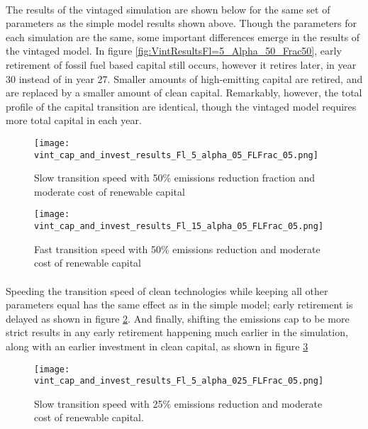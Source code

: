 \documentclass{article}
\begin{document}
\paragraph{} The results of the vintaged simulation are shown below for the same set of parameters as the simple model results shown above. Though the parameters for each simulation are the same, some important differences emerge in the results of the vintaged model. In figure \ref{fig:VintResultsFl=5_Alpha_50_Frac50}, early retirement of fossil fuel based capital still occurs, however it retires later, in year 30 instead of in year 27. Smaller amounts of high-emitting capital are retired, and are replaced by a smaller amount of clean capital. Remarkably, however, the total profile of the capital transition are identical, though the vintaged model requires more total capital in each year. 

\begin{figure}[h]
\texttt{[image: vint\_cap\_and\_invest\_results\_Fl\_5\_alpha\_05\_FLFrac\_05.png]}
\caption{Slow transition speed with 50\% emissions reduction fraction and moderate cost of renewable capital\label{fig:VintResultsFl=5_Alpha50_Frac50}}
\end{figure}

\FloatBarrier


\begin{figure}[H]
\texttt{[image: vint\_cap\_and\_invest\_results\_Fl\_15\_alpha\_05\_FLFrac\_05.png]}
\caption{Fast transition speed with 50\% emissions reduction and moderate cost of renewable capital\label{fig:VintResultsFl=15_Alpha50_Frac50}}
\end{figure}

\paragraph{} Speeding the transition speed of clean technologies while keeping all other parameters equal has the same effect as in the simple model; early retirement is delayed as shown in figure \ref{fig:VintResultsFl=15_Alpha50_Frac50}. And finally, shifting the emissions cap to be more strict results in any early retirement happening much earlier in the simulation, along with an earlier investment in clean capital, as shown in figure \ref{fig:VintResultsFl=15_Alpha25_Frac50}



\begin{figure}[H]
\texttt{[image: vint\_cap\_and\_invest\_results\_Fl\_5\_alpha\_025\_FLFrac\_05.png]}
\caption{Slow transition speed with 25\% emissions reduction and moderate cost of renewable capital. \label{fig:VintResultsFl=15_Alpha25_Frac50}}
\end{figure}
\end{document}
